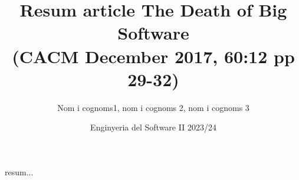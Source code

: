\documentclass[11pt,a4paper]{article}
\title{Resum article The Death of Big Software \\(CACM December 2017, 60:12 pp 29-32)}
\date{Enginyeria del Software II 2023/24}
\author{Nom i cognoms1, nom i cognoms 2, nom i cognoms 3}
\begin{document}
    \maketitle
    
    resum...
\end{document}
